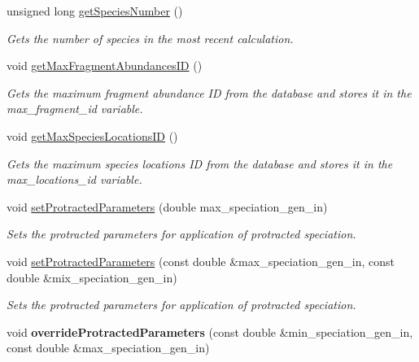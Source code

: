 \begin{DoxyCompactItemize}
unsigned long \hyperlink{group___community_objects_a8523432488d6586521c5994cad4215d8}{get\+Species\+Number} ()
\begin{DoxyCompactList}\small\item\em Gets the number of species in the most recent calculation. \end{DoxyCompactList}\item 
void \hyperlink{group___community_objects_af6fe28e1047ed5b56fde833e4b2b30de}{get\+Max\+Fragment\+Abundances\+ID} ()
\begin{DoxyCompactList}\small\item\em Gets the maximum fragment abundance ID from the database and stores it in the max\+\_\+fragment\+\_\+id variable. \end{DoxyCompactList}\item 
void \hyperlink{group___community_objects_a04d65ed53ea9e2cb6ce02dddccf3d33e}{get\+Max\+Species\+Locations\+ID} ()
\begin{DoxyCompactList}\small\item\em Gets the maximum species locations ID from the database and stores it in the max\+\_\+locations\+\_\+id variable. \end{DoxyCompactList}\item 
void \hyperlink{group___community_objects_aa5643c34557be54ea2674e78a1e0c53a}{set\+Protracted\+Parameters} (double max\+\_\+speciation\+\_\+gen\+\_\+in)
\begin{DoxyCompactList}\small\item\em Sets the protracted parameters for application of protracted speciation. \end{DoxyCompactList}\item 
void \hyperlink{group___community_objects_a3833e048848d21bc0292c05e86b7d5ce}{set\+Protracted\+Parameters} (const double \&max\+\_\+speciation\+\_\+gen\+\_\+in, const double \&mix\+\_\+speciation\+\_\+gen\+\_\+in)
\begin{DoxyCompactList}\small\item\em Sets the protracted parameters for application of protracted speciation. \end{DoxyCompactList}\item 
void {\bfseries override\+Protracted\+Parameters} (const double \&min\+\_\+speciation\+\_\+gen\+\_\+in, const double \&max\+\_\+speciation\+\_\+gen\+\_\+in)\hypertarget{group___community_objects_a132137f2a27a6fad21ada4c94726480a}{}\label{group___community_objects_a132137f2a27a6fad21ada4c94726480a}


\end{DoxyCompactItemize}
